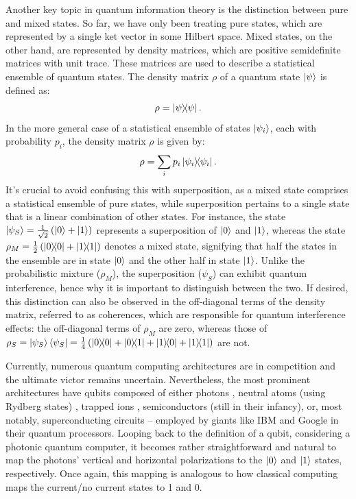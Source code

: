 Another key topic in quantum information theory is the distinction between pure and mixed states. So far, we have only been treating pure states, which are represented by a single ket vector in some Hilbert space. Mixed states, on the other hand, are represented by density matrices, which are positive semidefinite matrices with unit trace. These matrices are used to describe a statistical ensemble of quantum states. The density matrix $\rho$ of a quantum state $\ket{\psi}$ is defined as:
\begin{equation}
  \rho = \dyad{\psi}{\psi}.
\end{equation}
In the more general case of a statistical ensemble of states $\ket{\psi_i}$, each with probability $p_i$, the density matrix $\rho$ is given by:
\begin{equation}
  \rho = \sum_i p_i \dyad{\psi_i}{\psi_i}.
\end{equation}
It's crucial to avoid confusing this with superposition, as a mixed state comprises a statistical ensemble of pure states, while superposition pertains to a single state that is a linear combination of other states. For instance, the state $\ket{\psi_S} = \frac{1}{\sqrt{2}}\left(\ket{0} + \ket{1}\right)$ represents a superposition of $\ket{0}$ and $\ket{1}$, whereas the state $\rho_M = \frac{1}{2}\left(\dyad{0}{0} + \dyad{1}{1}\right)$ denotes a mixed state, signifying that half the states in the ensemble are in state $\ket{0}$ and the other half in state $\ket{1}$. Unlike the probabilistic mixture ($\rho_M$), the superposition ($\psi_S$) can exhibit quantum interference, hence why it is important to distinguish between the two. If desired, this distinction can also be observed in the off-diagonal terms of the density matrix, referred to as coherences, which are responsible for quantum interference effects: the off-diagonal terms of $\rho_{M}$ are zero, whereas those of $\rho_{S} = \ket{\psi_S}\bra{\psi_S} = \frac{1}{4}\left(\dyad{0}{0} + \dyad{0}{1} + \dyad{1}{0} + \dyad{1}{1}\right)$ are not.

Currently, numerous quantum computing architectures are in competition and the ultimate victor remains uncertain. Nevertheless, the most prominent architectures have qubits composed of either photons \cite{slussarenko2019photonic, Xanadu_Photonics}, neutral atoms (using Rydberg states) \cite{Henriet2020quantumcomputing, Wu_2021}, trapped ions \cite{bruzewicz2019trapped}, semiconductors (still in their infancy), or, most notably, superconducting circuits \cite{Huang_2020, SC_Qubits} – employed by giants like IBM and Google in their quantum processors. Looping back to the definition of a qubit, considering a photonic quantum computer, it becomes rather straightforward and natural to map the photons' vertical and horizontal polarizations to the $\ket{0}$ and $\ket{1}$ states, respectively. Once again, this mapping is analogous to how classical computing maps the current/no current states to 1 and 0.

